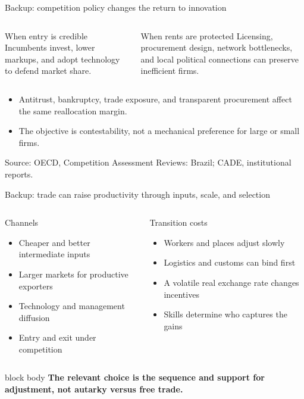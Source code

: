 \documentclass[10pt,aspectratio=169]{beamer}
\newcommand{\source}[1]{%
  \par\vfill{\tiny\color{MidGray}Source: #1}}
\newcommand{\question}[1]{%
  \begin{beamercolorbox}[rounded=true,sep=0.55em,wd=\textwidth]{block body}
    \centering\large\textbf{#1}
  \end{beamercolorbox}}
\begin{document}
\begin{frame}{Backup: competition policy changes the return to innovation}
  \begin{columns}[T,onlytextwidth]
      \begin{block}{When entry is credible}
        Incumbents invest, lower markups, and adopt technology to defend market share.
      \end{block}
      \begin{exampleblock}{When rents are protected}
        Licensing, procurement design, network bottlenecks, and local political connections can preserve inefficient firms.
      \end{exampleblock}
  \end{columns}
  \vspace{.6cm}
  \begin{itemize}
    \item Antitrust, bankruptcy, trade exposure, and transparent procurement affect the same reallocation margin.
    \item The objective is contestability, not a mechanical preference for large or small firms.
  \end{itemize}
  \source{OECD, Competition Assessment Reviews: Brazil; CADE, institutional reports.}
\end{frame}

\begin{frame}{Backup: trade can raise productivity through inputs, scale, and selection}
  \begin{columns}[T,onlytextwidth]
      \begin{block}{Channels}
        \begin{itemize}
          \item Cheaper and better intermediate inputs
          \item Larger markets for productive exporters
          \item Technology and management diffusion
          \item Entry and exit under competition
        \end{itemize}
      \end{block}
      \begin{exampleblock}{Transition costs}
        \begin{itemize}
          \item Workers and places adjust slowly
          \item Logistics and customs can bind first
          \item A volatile real exchange rate changes incentives
          \item Skills determine who captures the gains
        \end{itemize}
      \end{exampleblock}
  \end{columns}
  \vspace{.35cm}
  \question{The relevant choice is the sequence and support for adjustment, not autarky versus free trade.}
\end{frame}
\end{document}
